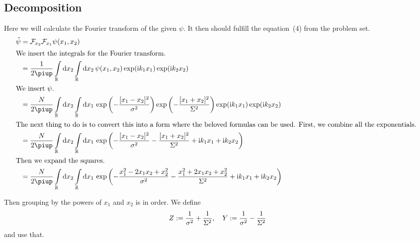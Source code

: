 \documentclass[11pt, english, fleqn, DIV=15, headinclude, BCOR=1.5cm]{scrartcl}
\begin{document}
\begin{landscape}
\subsection{Decomposition}

Here we will calculate the Fourier transform of the given $\psi$. It then
should fulfill the equation~(4) from the problem set.
\begin{align*}
    \tilde \psi
    &= \mathcal F_{x_2} \mathcal F_{x_1} \psi(x_1, x_2) \\
    \intertext{%
        We insert the integrals for the Fourier transform.
    }
    &= \frac{1}{2\piup} \intop_\R \dif x_2 \intop_\R \dif x_2 \, \psi(x_1, x_2)
    \exp(\iup k_1 x_1) \exp(\iup k_2 x_2) \\
    \intertext{%
        We insert $\psi$.
    }
    &= \frac{N}{2\piup} \intop_\R \dif x_2 \intop_\R \dif x_1 \, 
    \exp\del{- \frac{[x_1 - x_2]^2}{\sigma^2}}
    \exp\del{- \frac{[x_1 + x_2]^2}{\Sigma^2}}
    \exp(\iup k_1 x_1) \exp(\iup k_2 x_2) \\
    \intertext{%
        The next thing to do is to convert this into a form where the beloved
        formulas can be used. First, we combine all the exponentials.
    }
    &= \frac{N}{2\piup} \intop_\R \dif x_2 \intop_\R \dif x_1 \, 
    \exp\del{- \frac{[x_1 - x_2]^2}{\sigma^2} - \frac{[x_1 + x_2]^2}{\Sigma^2} + \iup k_1 x_1 + \iup k_2 x_2} \\
    \intertext{%
        Then we expand the squares.
    }
    &= \frac{N}{2\piup} \intop_\R \dif x_2 \intop_\R \dif x_1 \, 
    \exp\del{- \frac{x_1^2 - 2 x_1 x_2 + x_2^2}{\sigma^2} - \frac{x_1^2 + 2 x_1
    x_2 + x_2^2}{\Sigma^2} + \iup k_1 x_1 + \iup k_2 x_2}
\end{align*}
\end{landscape}
Then grouping by the powers of $x_1$ and $x_2$ is in order. We define 
\[
    Z := \frac{1}{\sigma^2} + \frac{1}{\Sigma^2}
    ,\quad
    Y := \frac{1}{\sigma^2} - \frac{1}{\Sigma^2}
\]
and use that.
\end{document}

